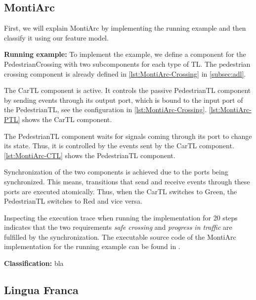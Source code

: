 \documentclass[runningheads]{llncs}
\begin{document}
\subsection{MontiArc} \label{subsec:montiArc}
First, we will explain MontiArc by implementing the running example and then classify it using our feature model.

\textbf{Running example:} To implement the example, we define a component for the \textsf{PedestrianCrossing} with two subcomponents for each type of TL.
The pedestrian crossing component is already defined in \autoref{lst:MontiArc-Crossing} in \autoref{subsec:adl}.

The \textsf{CarTL} component is active.
It controls the passive \textsf{PedestrianTL} component by sending events through its output port, which is bound to the input port of the \textsf{PedestrianTL}, see the configuration in \autoref{lst:MontiArc-Crossing}.
\autoref{lst:MontiArc-PTL} shows the \textsf{CarTL} component.



The \textsf{PedestrianTL} component waits for signals coming through its port to change its state.
Thus, it is controlled by the events sent by the \textsf{CarTL} component.
\autoref{lst:MontiArc-CTL} shows the \textsf{PedestrianTL} component.



Synchronization of the two components is achieved due to the ports being synchronized.
This means, transitions that send and receive events through these ports are executed atomically.
Thus, when the \textsf{CarTL} switches to \textsf{Green}, the \textsf{PedestrianTL} switches to \textsf{Red} and vice versa.

Inspecting the execution trace when running the implementation for 20 steps indicates that the two requirements \textit{safe crossing} and \textit{progress in traffic} are fulfilled by the synchronization.
The executable source code of the MontiArc implementation for the running example can be found in \cite{anonymousauthorsCoordination2024Artifacts2024}.

\textbf{Classification:} bla
\subsection{Lingua Franca} %
\end{document}

